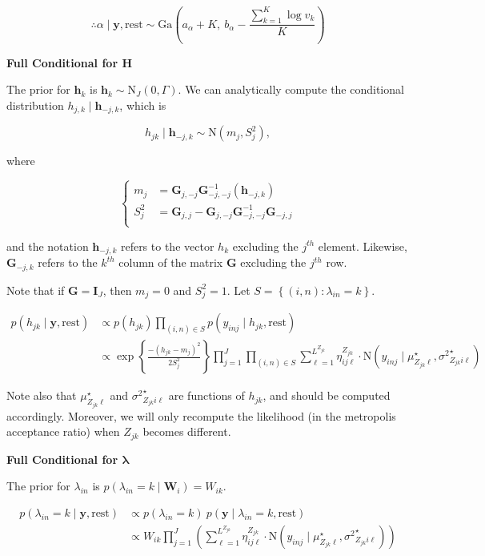 \documentclass[12pt,]{article}
\newcommand{\p}[1]{\left(#1\right)}
\newcommand{\bc}[1]{ \left\{#1\right\} }
\newcommand{\N}{ \mathcal{N} }
\newcommand{\I}{\mathrm{\mathbf{I}}}
\def\N{\text{N}}
\def\G{\text{Ga}}
\def\lin{\lambda_{in}}
\def\y{\bm{y}}
\def\mus{\mu^\star}
\def\sss{{\sigma^2}^\star}
\def\rest{\text{rest}}
\def\h{\bm{h}}
\begin{document}
\[
\therefore \alpha \mid \y, \rest \sim 
\G\p{a_\alpha + K,~ b_\alpha - \frac{\sum_{k=1}^K \log v_k}{K}}
\]
\vspace{2em}


\textbf{Full Conditional for $\bm H$}

The prior for \(\h_k\) is \(\h_k \sim \N_J(0, \Gamma)\). We can
analytically compute the conditional distribution
\(h_{j,k} \mid \h_{-j,k}\), which is

\[
h_{jk}  \mid \h_{-j,k} \sim \N(m_j, S^2_j),
\]

where

\[
\begin{cases}
m_j &= \bm G_{j,-j} \bm G_{-j,-j}^{-1}(\h_{-j,k})\\
S_j^2 &= \bm G_{j,j} - \bm G_{j,-j}\bm G_{-j,-j}^{-1}\bm G_{-j,j}\\
\end{cases}
\]

and the notation \(\h_{-j,k}\) refers to the vector \(h_k\) excluding
the \(j^{th}\) element. Likewise, \(\bm G_{-j,k}\) refers to the
\(k^{th}\) column of the matrix \(\bm G\) excluding the \(j^{th}\) row.

Note that if \(\bm G = \I_J\), then \(m_j=0\) and \(S_j^2 = 1\). Let
\(S = \bc{(i,n)\colon \lin=k}\).

\begin{align*}
p(h_{jk} \mid \y, \rest)  &\propto p(h_{jk}) \prod_{(i,n) \in S} p(y_{inj} \mid h_{jk}, \rest) \\
%
&\propto
\exp\bc{\frac{-(h_{jk} - m_j)^2}{2S_j^2}}
 \prod_{j=1}^J \prod_{(i,n)\in S}
\sum_{\ell=1}^{L^{Z_{jk}}} \eta^{Z_{jk}}_{ij\ell} \cdot
\N(y_{inj} \mid \mus_{Z_{jk}\ell}, \sss_{Z_{jk}i\ell})
\end{align*}


Note also that \(\mus_{Z_{jk}\ell}\) and \(\sss_{Z_{jk}i\ell}\) are
functions of \(h_{jk}\), and should be computed accordingly. Moreover,
we will only recompute the likelihood (in the metropolis acceptance
ratio) when \(Z_{jk}\) becomes different.  
\vspace{2em}


\textbf{Full Conditional for $\bm \lambda$}

The prior for \(\lin\) is \(p(\lin = k \mid \bm W_i) = W_{ik}\).

\begin{align*}
p(\lin=k\mid \y,\rest) &\propto p(\lin=k) ~ p(\y \mid \lin=k, \rest) \\
&\propto W_{ik}
\prod_{j=1}^J 
\p{
  \sum_{\ell=1}^{L^{Z_{jk}}} \eta^{Z_{jk}}_{ij\ell} \cdot
  \N(y_{inj} \mid 
  \mus_{Z_{jk}\ell}, \sss_{Z_{jk}i\ell})
}\\
\end{align*}
\end{document}
